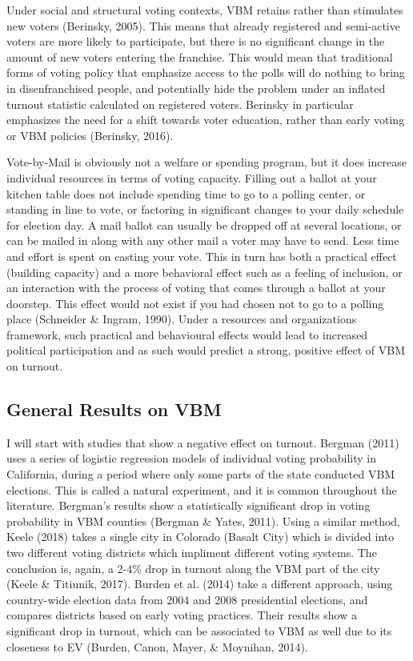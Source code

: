 \documentclass[12pt,twoside]{reedthesis}
\begin{document}
  Under social and structural voting contexts, VBM retains rather than
  stimulates new voters (Berinsky, 2005). This means that already
  registered and semi-active voters are more likely to participate, but
  there is no significant change in the amount of new voters entering the
  franchise. This would mean that traditional forms of voting policy that
  emphasize access to the polls will do nothing to bring in
  disenfranchised people, and potentially hide the problem under an
  inflated turnout statistic calculated on registered voters. Berinsky in
  particular emphasizes the need for a shift towards voter education,
  rather than early voting or VBM policies (Berinsky, 2016).
  
  Vote-by-Mail is obviously not a welfare or spending program, but it does
  increase individual resources in terms of voting capacity. Filling out a
  ballot at your kitchen table does not include spending time to go to a
  polling center, or standing in line to vote, or factoring in significant
  changes to your daily schedule for election day. A mail ballot can
  usually be dropped off at several locations, or can be mailed in along
  with any other mail a voter may have to send. Less time and effort is
  spent on casting your vote. This in turn has both a practical effect
  (building capacity) and a more behavioral effect such as a feeling of
  inclusion, or an interaction with the process of voting that comes
  through a ballot at your doorstep. This effect would not exist if you
  had chosen not to go to a polling place (Schneider \& Ingram, 1990).
  Under a resources and organizations framework, such practical and
  behavioural effects would lead to increased political participation and
  as such would predict a strong, positive effect of VBM on turnout.
  
  \subsection{General Results on VBM}\label{general-results-on-vbm}
  
  I will start with studies that show a negative effect on turnout.
  Bergman (2011) uses a series of logistic regression models of individual
  voting probability in California, during a period where only some parts
  of the state conducted VBM elections. This is called a natural
  experiment, and it is common throughout the literature. Bergman's
  results show a statistically significant drop in voting probability in
  VBM counties (Bergman \& Yates, 2011). Using a similar method, Keele
  (2018) takes a single city in Colorado (Basalt City) which is divided
  into two different voting districts which impliment different voting
  systems. The conclusion is, again, a 2-4\% drop in turnout along the VBM
  part of the city (Keele \& Titiunik, 2017). Burden et al. (2014) take a
  different approach, using country-wide election data from 2004 and 2008
  presidential elections, and compares districts based on early voting
  practices. Their results show a significant drop in turnout, which can
  be associated to VBM as well due to its closeness to EV (Burden, Canon,
  Mayer, \& Moynihan, 2014).
  
\end{document}

